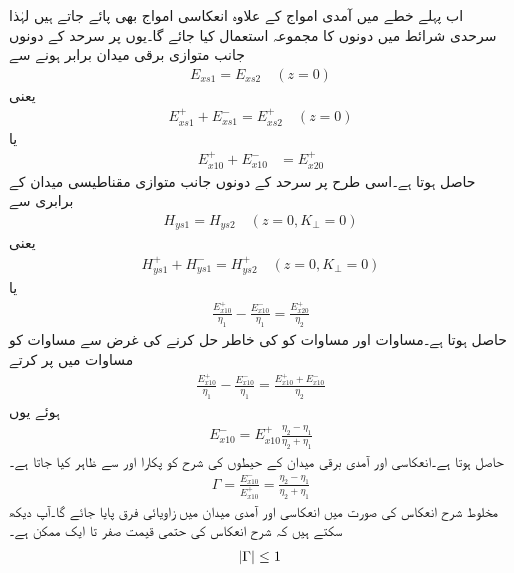 اب پہلے خطے میں آمدی امواج کے علاوہ انعکاسی امواج بھی پائے جاتے ہیں لہٰذا سرحدی شرائط میں دونوں کا مجموعہ استعمال کیا جائے گا۔یوں  پر سرحد کے دونوں جانب متوازی برقی میدان برابر  ہونے سے
\begin{align*}
E_{xs1}=E_{xs2}    \quad (z=0)
\end{align*}
یعنی
\begin{align*}
E_{xs1}^+ +E_{xs1}^-=E_{xs2}^+ \quad (z=0)
\end{align*}
یا
\begin{align}\label{مساوات_موج_برقی_شرط_پورا}
E_{x10}^+ + E_{x10}^-&=E_{x20}^+
\end{align}
حاصل ہوتا ہے۔اسی طرح   پر سرحد کے دونوں جانب متوازی مقناطیسی میدان کے برابری سے
\begin{align*}
H_{ys1}=H_{ys2} \quad (z=0, K_\perp=0)
\end{align*}
یعنی
\begin{align*}
H_{ys1}^+ +H_{ys1}^-=H_{ys2}^+ \quad (z=0, K_\perp=0)
\end{align*}
یا
\begin{align}\label{مساوات_موج_مقناطیسی_شرط_پورا}
\frac{E_{x10}^+}{\eta_1}-\frac{E_{x10}^-}{\eta_1}=\frac{E_{x20}^+}{\eta_2}
\end{align}
حاصل ہوتا ہے۔مساوات  اور مساوات  کو  کی خاطر حل کرنے کی غرض سے مساوات  کو مساوات  میں پر کرتے
\begin{align*}
\frac{E_{x10}^+}{\eta_1}-\frac{E_{x10}^-}{\eta_1}=\frac{E_{x10}^+ + E_{x10}^-}{\eta_2}
\end{align*}
ہوئے یوں
\begin{align*}
E_{x10}^- =E_{x10}^+ \frac{\eta_2-\eta_1}{\eta_2+\eta_1}
\end{align*}
حاصل ہوتا ہے۔انعکاسی اور آمدی برقی میدان کے حیطوں کی شرح کو  پکارا  اور  سے ظاہر کیا جاتا ہے۔
\begin{align}\label{مساوات_موج_شرح_انعکاس_تعریف}
\Gamma=\frac{E_{x10}^-}{E_{x10}^+}=\frac{\eta_2-\eta_1}{\eta_2+\eta_1}
\end{align}
مخلوط شرح انعکاس کی صورت میں انعکاسی اور آمدی میدان میں زاویائی فرق پایا جائے گا۔آپ دیکھ سکتے ہیں کہ شرح انعکاس کی حتمی قیمت صفر تا ایک ممکن ہے۔
\begin{align}
\abs{\Gamma} \le 1
\end{align}

